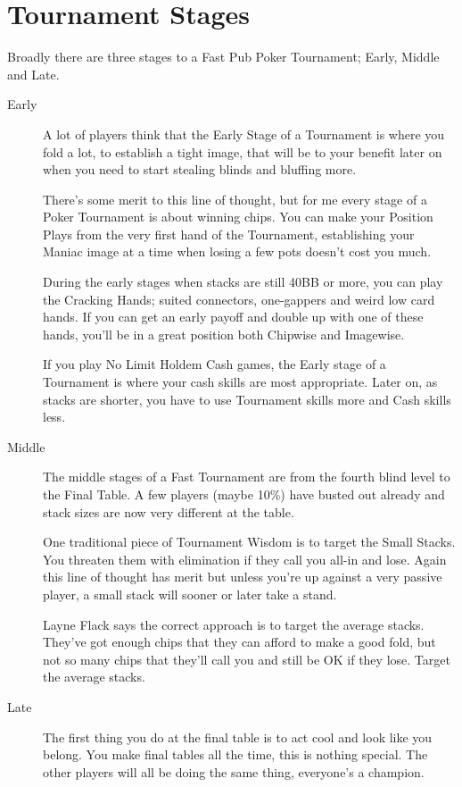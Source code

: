 \chapter{Tournament Stages}


Broadly there are three stages to a Fast Pub Poker Tournament;
Early, Middle and Late.

\begin{description}

\item[Early] A lot of players think that the Early Stage of a
Tournament is where you fold a lot, to establish a tight image,
that will be to your benefit later on when you need to start
stealing blinds and bluffing more.

There's some merit to this line of thought, but for me every stage
of a Poker Tournament is about winning chips. You can make
your Position Plays from the very first hand of the Tournament,
establishing your Maniac image at a time when losing a few pots
doesn't cost you much.

During the early stages when stacks are still 40BB or more, you can
play the Cracking Hands; suited connectors, one-gappers and weird
low card hands. If you can get an early payoff and double up with
one of these hands, you'll be in a great position both
Chipwise and Imagewise.

If you play No Limit Holdem Cash games, the Early stage of a Tournament
is where your cash skills are most appropriate. Later on, as stacks
are shorter, you have to use Tournament skills more and Cash skills less.

\item[Middle] The middle stages of a Fast Tournament are from the
fourth blind level to the Final Table. A few players (maybe 10\%)
have busted out already and stack sizes are now very different
at the table.

One traditional piece of Tournament Wisdom is to target the Small Stacks.
You threaten them with elimination if they call you all-in and lose.
Again this line of thought has merit but unless you're up against
a very passive player, a small stack will sooner or later take a stand.

Layne Flack says the correct approach is to target the average stacks.
They've got enough chips that they can afford to make a good fold,
but not so many chips that they'll call you and still be OK if they lose.
Target the average stacks.

\item[Late] The first thing you do at the final table is to act cool
and look like you belong. You make final tables all the time, this is
nothing special. The other players will all be doing the same
thing, everyone's a champion.

\end{description}
